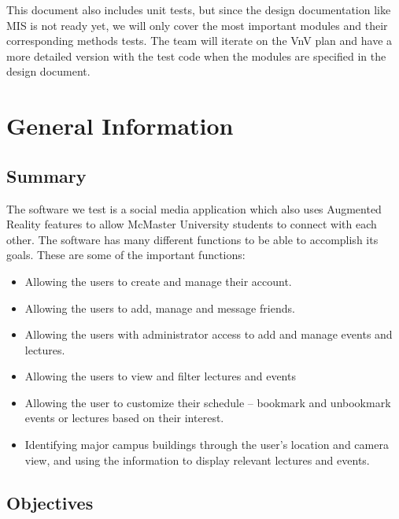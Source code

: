 \documentclass[12pt, titlepage]{article}
\begin{document}
This document also includes unit tests, but since the design documentation like MIS is not ready yet, we will only cover the most important modules and their corresponding methods tests. The team will iterate on the VnV plan and have a more detailed version with the test code when the modules are specified in the design document.

\section{General Information}

\subsection{Summary}
  
The software we test is a social media application which also uses Augmented Reality features to allow McMaster University students to connect with each other. The software has many different functions to be able to accomplish its goals. These are some of the important functions:

 \begin{itemize}
     \item  Allowing the users to create and manage their account.

     \item  Allowing the users to add, manage and message friends.

     \item  Allowing the users with administrator access to add and manage events and lectures.

     \item  Allowing the users to view and filter lectures and events 
     
     \item Allowing the user to customize their schedule -- bookmark and unbookmark events or lectures based on their interest.

     \item  Identifying major campus buildings through the user's location and camera view, and using the information to display relevant lectures and events.

 \end{itemize}

 

\subsection{Objectives}
\end{document}
